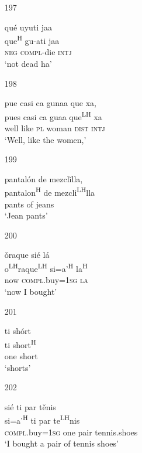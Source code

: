 \begin{itemize}
\item[197]
 
\glll   qu\'{e} uyuti jaa \\
 que\textsuperscript{H} gu-ati jaa \\
\textsc{neg} \textsc{compl}-die \textsc{intj} \\
\glt `not dead ha'
 


\item[198]
 
\glll   pue casi ca gunaa que xa,  \\
 pues casi ca guaa que\textsuperscript{LH} xa \\
well like \textsc{pl}  woman \textsc{dist} \textsc{intj}  \\
\glt `Well, like the women,'
 


\item[199]
 
\glll   pantal\'{o}n de mezcl\v{i}lla, \\
pantalon\textsuperscript{H} de mezcli\textsuperscript{LH}lla \\
 pants of jeans \\
\glt `Jean pants'
 


\item[200]
 
\glll   \v{o}raque si\'{e} l\'{a} \\
o\textsuperscript{LH}raque\textsuperscript{LH} si=a'\textsuperscript{H} la\textsuperscript{H} \\
 now \textsc{compl}.buy=\textsc{1sg} \textsc{la} \\
\glt `now I bought'
 


\item[201]
 
\glll   ti sh\'{o}rt \\
ti short\textsuperscript{H} \\
one short  \\
\glt `shorts'
 


\item[202]
 
\glll   si\'{e} ti par t\v{e}nis \\
si=a'\textsuperscript{H} ti par te\textsuperscript{LH}nis \\ 
 \textsc{compl}.buy=\textsc{1sg} one pair tennis.shoes \\
\glt `I bought a pair of tennis shoes'
 



\end{itemize}
